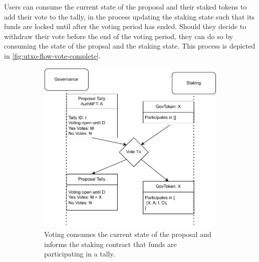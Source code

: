 \documentclass[11pt]{article}
\begin{document}
Users can consume the current state of the proposal and their staked tokens to add their vote to the tally,
in the process updating the staking state such that its funds are locked until after the voting period has ended.
Should they decide to withdraw their vote before the end of the voting period, they can do so by consuming the
state of the propsal and the staking state.
This process is depicted in \cref{fig:utxo-flow-vote-complete}.

\begin{figure}
    \centering
    \begin{subfigure}[b]{0.5\textwidth}
        \centering
        \includegraphics[width=\textwidth]{figures/gov-vote.pdf}
        \caption{Voting consumes the current state of the proposal and informs the staking contract that funds are participating in a tally.}
        \label{fig:utxo-flow-vote}
    \end{subfigure}
    \hfill
    \begin{subfigure}[b]{0.35\textwidth}
        \centering

\end{subfigure}
\end{figure}
\end{document}
